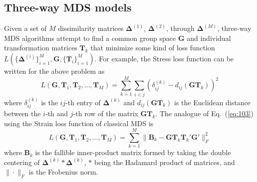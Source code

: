 \subsection{Three-way MDS models}
\label{sec:three-way-mds-1}
Given a set of $M$ dissimilarity matrices $\bm{\Delta}^{(1)}$,
$\bm{\Delta}^{(2)}$, through $\bm{\Delta}^{(M)}$, three-way MDS
algorithms attempt to find a common group space $\mathbf{G}$ and
individual transformation matrices $\mathbf{T}_k$ that minimize some kind
of loss function $L(\{\bm{\Delta}^{(i)}\}_{i=1}^{M}, \mathbf{G},
\{\mathbf{T}_i\}_{i=1}^{M})$. For example, the Stress loss function
\citep{kruskal64:_nonmet} can be written for the above problem as
\begin{equation}
  \label{eq:103}
  L(\mathbf{G}, \mathbf{T}_1, \mathbf{T}_{2}, \dots, \mathbf{T}_M) =
  \sum_{k = 1}^{M}\sum_{i < j} (\delta_{ij}^{(k)} -
  d_{ij}(\mathbf{G}\mathbf{T}_k))^2
\end{equation}
where $\delta_{ij}^{(k)}$ is the $ij$-th entry of $\bm{\Delta}^{(k)}$
and $d_{ij}(\mathbf{G}\mathbf{T}_k)$ is the Euclidean distance between
the $i$-th and $j$-th row of the matrix
$\mathbf{G}\mathbf{T}_k$. The analogue of Eq.~(\ref{eq:103}) using the
Strain loss function of classical MDS \citep{torgesen52:_multid,gower66:_some} is 
\begin{equation}
  \label{eq:107}
  L(\mathbf{G}, \mathbf{T}_1, \mathbf{T}_2, \dots, \mathbf{T}_M)
  = \sum_{k = 1}^{M}\| \mathbf{B}_k -
  \mathbf{G}\mathbf{T}_k \mathbf{T}_k' \mathbf{G}' \|_F^2 
\end{equation}
where $\mathbf{B}_k$ is the fallible inner-product
matrix formed by taking the double centering of $\bm{\Delta}^{(k)}
\ast \bm{\Delta}^{(k)}$, $\ast$ being the Hadamard product of
matrices, and $\| \cdot \|_F$ is the Frobenius norm. \\ \\ 

